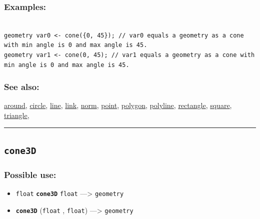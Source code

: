 \documentclass[]{book}
\providecommand{\tightlist}{%
  \setlength{\itemsep}{0pt}\setlength{\parskip}{0pt}}
\theoremstyle{definition}
\theoremstyle{definition}
\theoremstyle{definition}
\theoremstyle{remark}
\begin{document}
\subsubsection{Examples:}\label{examples-72}

\begin{verbatim}
 
geometry var0 <- cone({0, 45}); // var0 equals a geometry as a cone with min angle is 0 and max angle is 45. 
geometry var1 <- cone(0, 45); // var1 equals a geometry as a cone with min angle is 0 and max angle is 45.
\end{verbatim}

\subsubsection{See also:}\label{see-also-58}

\href{operators-a-to-a.html\#around}{around},
\href{operators-b-to-c.html\#circle}{circle},
\href{operators-i-to-m.html\#line}{line},
\href{operators-i-to-m.html\#link}{link},
\href{operators-n-to-r.html\#norm}{norm},
\href{operators-n-to-r.html\#point}{point},
\href{operators-n-to-r.html\#polygon}{polygon},
\href{operators-n-to-r.html\#polyline}{polyline},
\href{operators-n-to-r.html\#rectangle}{rectangle},
\href{operators-s-to-z.html\#square}{square},
\href{operators-s-to-z.html\#triangle}{triangle},

\begin{center}\rule{0.5\linewidth}{\linethickness}\end{center}

\subsection{\texorpdfstring{\texttt{cone3D}}{cone3D}}\label{cone3d}

\subsubsection{Possible use:}\label{possible-use-95}

\begin{itemize}
\tightlist
\item
  \texttt{float} \textbf{\texttt{cone3D}} \texttt{float}
  ---\textgreater{} \texttt{geometry}
\item
  \textbf{\texttt{cone3D}} (\texttt{float} , \texttt{float})
  ---\textgreater{} \texttt{geometry}
\end{itemize}
\end{document}
